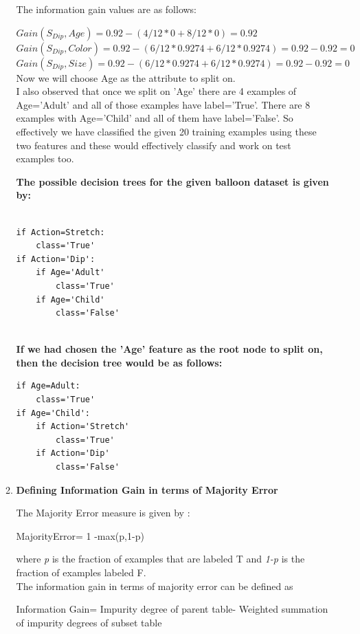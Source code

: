 \documentclass[11pt]{article}
\begin{document}
\begin{enumerate}
\begin{enumerate}
			The information gain values are as follows:
			
			$Gain(S_{Dip}, Age)=0.92- (4/12*0 + 8/12*0) =0.92$ \\
			$Gain(S_{Dip}, Color)=0.92 -(6/12 *0.9274 + 6/12 *0.9274) =0.92-0.92=0$\\
			$Gain(S_{Dip}, Size)=0.92 -(6/12 *0.9274 + 6/12 *0.9274) =0.92-0.92=0$\\
			
			Now we will choose Age as the attribute to split on. \\
			
			I also observed that once we split on 'Age' there are 4 examples of Age='Adult' and all of those examples have label='True'. There are 8 examples with Age='Child' and all of them have label='False'. So effectively we have classified the given 20 training examples using these two features and these would effectively classify and work on test examples too.
			
			\textbf{The possible decision trees for the given balloon dataset is given by:}
\begin{lstlisting}
			
if Action=Stretch:
	class='True'
if Action='Dip':
	if Age='Adult'
		class='True'
	if Age='Child'
		class='False'		
			
\end{lstlisting}
			
			\textbf{If we had chosen the 'Age' feature as the root node to split on, then the decision tree would be as follows:}
\begin{lstlisting}
if Age=Adult:
	class='True'
if Age='Child':
	if Action='Stretch'
		class='True'
	if Action='Dip'
		class='False'		
\end{lstlisting}
			
			\item \textbf{Defining Information Gain in terms of Majority Error}	
			
			The Majority Error measure is given by :	
			\begin{center}
				MajorityError= 1 -max(p,1-p)
			\end{center}
			where \emph{p} is the fraction of examples that are labeled T and \emph{1-p} is the fraction of examples labeled F. \\
			
			The information gain in terms of majority error can be defined as 
			
			Information Gain= Impurity degree of parent table- Weighted summation of impurity degrees of subset table\\
			

\end{enumerate}
\end{enumerate}
\end{document}
